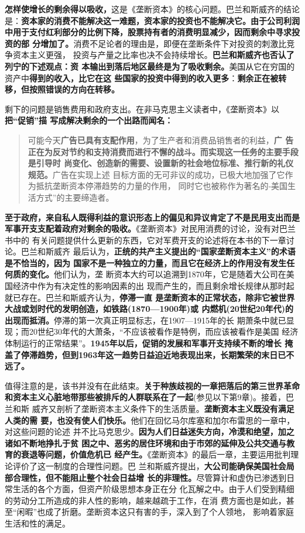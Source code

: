 \textbf{怎样使增长的剩余得以吸收，}这是《垄断资本》的核心问题。巴兰和斯威齐的结论
是：\textbf{资本家的消费不能解决这一难题，资本家的投资也不能解决它。由于公司利润
  中用于支付红利部分的比例下降，股票持有者的消费明显减少，因而剩余中寻求投资的部
  分增加了。}消费不足论者的理由是，即便在垄断条件下对投资的刺激比竞争资本主义更强，
投资与产量之比率也决不会持续增长。\textbf{巴兰和斯威齐也否认了列宁的下述观点：资
  本输出到落后地区最终是为了吸收剩余。}美国从它在穷国的资产中\textbf{得到的收入，比它在这
些国家的投资中得到的收入更多}：\textbf{剩余正在被转移，但按照错误的方向在转移。}

剩下的问题是销售费用和政府支出。在非马克思主义读者中，《垄断资本》以\textbf{把“促销”描
写成解决剩余的一个出路而闻名：}
\begin{quotation}
  可能今天\textbf{广告已具有支配作用}，为了生产者和消费品销售者的利益，\textbf{广
    告正在为反对节约和支持消费而进行不懈的战斗。而实现这一任务的主要手段是引导时
    尚变化、创造新的需要、设置新的社会地位标准、推行新的礼仪规范。}广告在实现上述
  目标方面的无可非议的成功，已极大地加强了它作为抵抗垄断资本停滞趋势的力量的作用，
  同时它也被称作为著名的‐美国生活方式”的主要缔造者。
\end{quotation}



\textbf{至于政府，来自私人既得利益的意识形态上的偏见和异议肯定了不是民用支出而是
  军事开支支配着政府对剩余的吸收。}《垄断资本》对民用消费的讨论，没有对巴兰书中的
有关问题提供什么更新的东西，它对军费开支的论述将在本书的下一章讨论。巴兰和斯威齐
最后认为，\textbf{正统的共产主义提出的“国家垄断资本主义”的术语是不恰当的，因为
  国家不是一种独立的力量，而且它在经济上的作用没有发生任何质的变化。}他们认为，垄
断资本大约可以追溯到1870年，它是随着大公司在美国经济中作为有决定性的影响因素的出
现而产生的，而且剩余增长规律从那时起就已存在。巴兰和斯威齐认为，\textbf{停滞一直
  是垄断资本的正常状态，除非它被世界大战或划时代的发明创造，如铁路(1870—1900年)或
  内燃机(20世纪20年代)的出现而抵消。}停滞的第一次真正明显标志，在1907—1915年的长
期萧条中就已显现；而20世纪30年代的大萧条，“不应该被看作是特例，而应该被看作是美国
经济体制运行的正常结果”。\textbf{1945年以后，促销的发展和军事开支持续不断的增长
  掩盖了停滞趋势，但到1963年这一趋势日益迫近地表现出来，长期繁荣的末日已不远了。}

值得注意的是，该书并没有在此结束。\textbf{关于种族歧视的一章把落后的第三世界革命
  和资本主义心脏地带那些被排斥的人群联系在了一起}(参见以下第9章)。接着，巴兰和斯
威齐又剖析了垄断资本主义条件下的生活质量。\textbf{垄断资本主义既没有满足人类的需
  要，也没有使人们快乐。}他们在回忆马尔库塞和加尔布雷思的一章中，对这些问题的论述
并不比马克思少。\textbf{因为人们日益迷失方向，冷漠和绝望，加之诸如不断地挣扎于贫
  困之中、恶劣的居住环境和由于市郊的延伸及公共交通与教育的衰退等问题，价值危机已
  经产生。}《垄断资本》的最后一章，主要运用批判理论评价了这一制度的合理性问题。巴
兰和斯威齐提出，\textbf{大公司能确保美国社会局部合理性，但不能阻止整个社会日益增
  长的非理性。}尽管算计和虚伪已渗透到日常生活的各个方面，但资产阶级思想本身正在分
化瓦解之中。由于人们受到精细的劳动分工所造成的非人性的影响，越来越疏于工作，在消
费方面也是如此，甚至“闲暇”也成了折磨。垄断资本这只有害的手，深入到了个人领地，
影响着家庭生活和性的满足。

